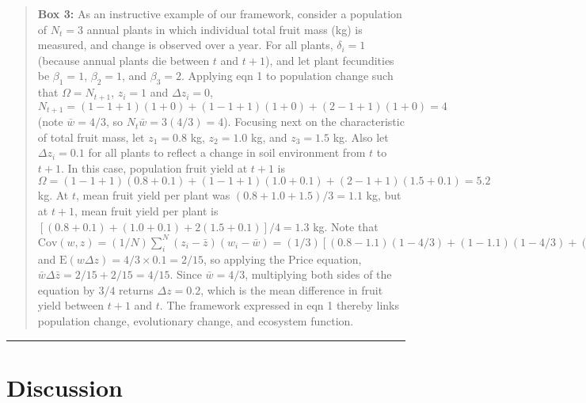 \documentclass[
]{article}
\begin{document}
\begin{quote}
\textbf{Box 3:} As an instructive example of our framework, consider a
population of \(N_{t} = 3\) annual plants in which individual total
fruit mass (kg) is measured, and change is observed over a year. For all
plants, \(\delta_{i} = 1\) (because annual plants die between \(t\) and
\(t+1\)), and let plant fecundities be \(\beta_{1} = 1\),
\(\beta_{2} = 1\), and \(\beta_{3} = 2\). Applying eqn 1 to population
change such that \(\Omega = N_{t+1}\), \(z_{i} = 1\) and
\(\Delta z_{i} = 0\),
\(N_{t+1} = (1 - 1 + 1)(1 + 0) + (1 - 1 + 1)(1 + 0) + (2 - 1 + 1)(1 + 0) = 4\)
(note \(\bar{w} = 4/3\), so \(N_{t}\bar{w} = 3(4/3) = 4\)). Focusing
next on the characteristic of total fruit mass, let \(z_{1} = 0.8\) kg,
\(z_{2} = 1.0\) kg, and \(z_{3} = 1.5\) kg. Also let
\(\Delta z_{i} = 0.1\) for all plants to reflect a change in soil
environment from \(t\) to \(t + 1\). In this case, population fruit
yield at \(t+1\) is
\(\Omega = (1 - 1 + 1)(0.8 + 0.1) + (1 - 1 + 1)(1.0 + 0.1) + (2 - 1 + 1)(1.5 + 0.1) = 5.2\)
kg. At \(t\), mean fruit yield per plant was
\((0.8 + 1.0 + 1.5)/3 = 1.1\) kg, but at \(t+1\), mean fruit yield per
plant is \([(0.8 + 0.1) + (1.0 + 0.1) + 2(1.5 + 0.1)]/4 = 1.3\) kg. Note
that
\(\mathrm{Cov}(w, z) = (1/N)\sum_{i}^{N}(z_{i} - \bar{z})(w_{i} - \bar{w}) = (1/3)\left[(0.8 - 1.1)(1-4/3) + (1 - 1.1)(1-4/3) + (1.5 - 1.1)(2-4/3) \right]  = 2/15\)
and \(\mathrm{E}(w \Delta z) = 4/3 \times 0.1 = 2/15\), so applying the
Price equation, \(\bar{w}\Delta \bar{z} = 2/15 + 2/15 = 4/15\). Since
\(\bar{w} = 4/3\), multiplying both sides of the equation by \(3/4\)
returns \(\Delta z = 0.2\), which is the mean difference in fruit yield
between \(t+1\) and \(t\). The framework expressed in eqn 1 thereby
links population change, evolutionary change, and ecosystem function.
\end{quote}

\begin{center}\rule{0.5\linewidth}{0.5pt}\end{center}

\section{Discussion}\label{discussion}
\end{document}
